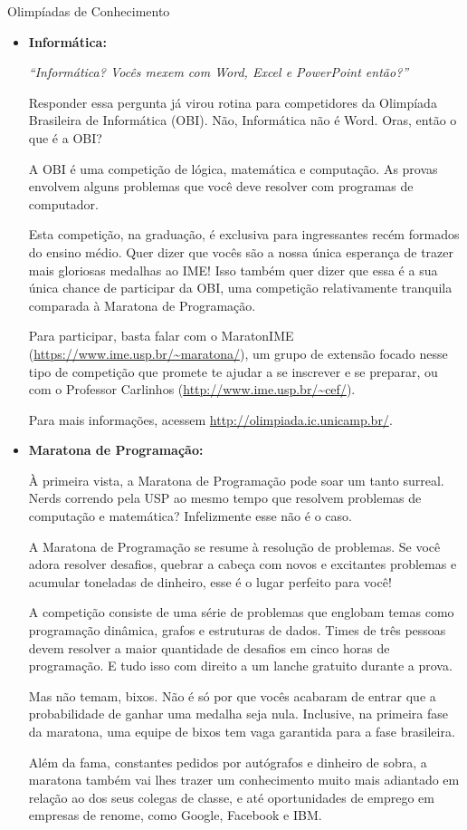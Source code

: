 \begin{subsecao}{Olimpíadas de Conhecimento}
\begin{itemize}
\item{\bf Informática: }

\textit{``Informática? Vocês mexem com Word, Excel e PowerPoint então?''}

Responder essa pergunta já virou rotina para competidores da Olimpíada
Brasileira de Informática (OBI). Não, Informática não é Word. Oras, então o que é a OBI?

A OBI é uma competição de lógica, matemática e computação. As provas envolvem
alguns problemas que você deve resolver com programas de computador.

Esta competição, na graduação, é exclusiva para ingressantes recém formados do
ensino médio. Quer dizer que vocês são a nossa única esperança de trazer mais
gloriosas medalhas ao IME! Isso também quer dizer que essa é a sua única chance
de participar da OBI, uma competição relativamente tranquila comparada à
Maratona de Programação.

Para participar, basta falar com o MaratonIME
(\url{https://www.ime.usp.br/~maratona/}), um grupo de extensão focado nesse
tipo de competição que promete te ajudar a se inscrever e se preparar, ou com o
Professor Carlinhos (\url{http://www.ime.usp.br/~cef/}).

Para mais informações, acessem \url{http://olimpiada.ic.unicamp.br/}.


\item{\bf Maratona de Programação: }

À primeira vista, a Maratona de Programação pode soar um tanto
surreal. Nerds correndo pela USP ao mesmo tempo que resolvem
problemas de computação e matemática? Infelizmente esse não
é o caso.

A Maratona de Programação se resume à resolução de problemas.
Se você adora resolver desafios, quebrar a cabeça com novos
e excitantes problemas e acumular toneladas de dinheiro, esse
é o lugar perfeito para você!

A competição consiste de uma série de problemas que englobam
temas como programação dinâmica, grafos e estruturas de dados.
Times de três pessoas devem resolver a maior quantidade de
desafios em cinco horas de programação. E tudo isso com direito
a um lanche gratuito durante a prova.

Mas não temam, bixos. Não é só por que vocês acabaram de entrar que
a probabilidade de ganhar uma medalha seja nula. Inclusive, na primeira
fase da maratona, uma equipe de bixos tem vaga garantida para a
fase brasileira.

Além da fama, constantes pedidos por autógrafos e dinheiro de sobra,
a maratona também vai lhes trazer um conhecimento muito mais
adiantado em relação ao dos seus colegas de classe, e até oportunidades
de emprego em empresas de renome, como Google, Facebook e IBM.


\end{itemize}
\end{subsecao}
